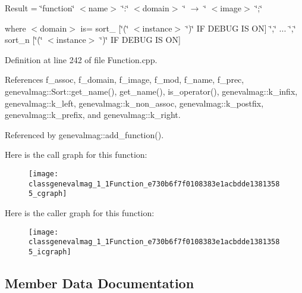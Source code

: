 Result = \char`\"{}function\char`\"{} $<$name$>$ \char`\"{}:\char`\"{} $<$domain$>$ \char`\"{} $\rightarrow$ \char`\"{} $<$image$>$ \char`\"{};\char`\"{}

where $<$domain$>$ is= sort\_ \mbox{[}\char`\"{}(\char`\"{} $<$instance$>$ \char`\"{})\char`\"{} IF DEBUG IS ON\mbox{]} \char`\"{},\char`\"{} ... \char`\"{},\char`\"{} sort\_\-n \mbox{[}\char`\"{}(\char`\"{} $<$instance$>$ \char`\"{})\char`\"{} IF DEBUG IS ON\mbox{]} 

Definition at line 242 of file Function.cpp.

References f\_\-assoc, f\_\-domain, f\_\-image, f\_\-mod, f\_\-name, f\_\-prec, genevalmag::Sort::get\_\-name(), get\_\-name(), is\_\-operator(), genevalmag::k\_\-infix, genevalmag::k\_\-left, genevalmag::k\_\-non\_\-assoc, genevalmag::k\_\-postfix, genevalmag::k\_\-prefix, and genevalmag::k\_\-right.

Referenced by genevalmag::add\_\-function().

Here is the call graph for this function:\nopagebreak
\begin{figure}[H]
\begin{center}
\leavevmode
\texttt{[image: classgenevalmag\_1\_1Function\_e730b6f7f0108383e1acbdde13813585\_cgraph]}
\end{center}
\end{figure}


Here is the caller graph for this function:\nopagebreak
\begin{figure}[H]
\begin{center}
\leavevmode
\texttt{[image: classgenevalmag\_1\_1Function\_e730b6f7f0108383e1acbdde13813585\_icgraph]}
\end{center}
\end{figure}


\subsection{Member Data Documentation}
\hypertarget{classgenevalmag_1_1Function_20f4e51ba6a747b7422406b6af6b40a1}{
\subsubsection[{f\_\-assoc}]{}}
\label{classgenevalmag_1_1Function_20f4e51ba6a747b7422406b6af6b40a1}


